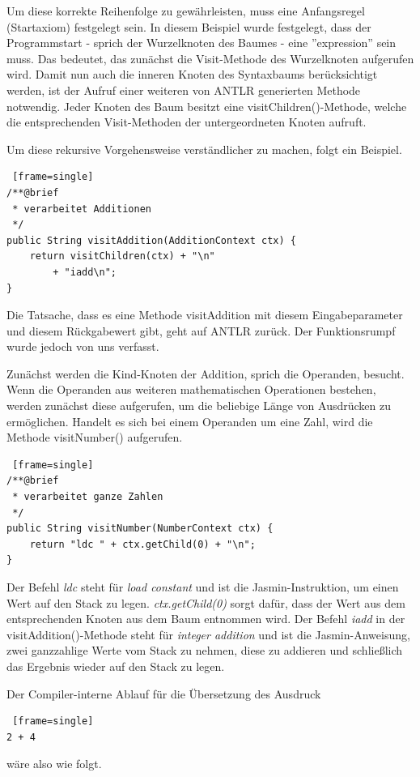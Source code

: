 \documentclass[12pt, a4paper, oneside, ngerman]{article}
\begin{document}
Um diese korrekte Reihenfolge zu gewährleisten, muss eine Anfangsregel (Startaxiom) festgelegt sein. In diesem Beispiel wurde festgelegt, dass der Programmstart - sprich der Wurzelknoten des Baumes - eine ''expression'' sein muss. Das bedeutet, das zunächst die Visit-Methode des Wurzelknoten aufgerufen wird. Damit nun auch die inneren Knoten des Syntaxbaums berücksichtigt werden, ist der Aufruf einer weiteren von ANTLR generierten Methode notwendig. Jeder Knoten des Baum besitzt eine visitChildren()-Methode, welche die entsprechenden Visit-Methoden der untergeordneten Knoten aufruft.

\pagebreak

Um diese rekursive Vorgehensweise verständlicher zu machen, folgt ein Beispiel.


\begin{lstlisting} [frame=single]
/**@brief
 * verarbeitet Additionen
 */
public String visitAddition(AdditionContext ctx) {
	return visitChildren(ctx) + "\n"
		+ "iadd\n";
}
\end{lstlisting}
Die Tatsache, dass es eine Methode visitAddition mit diesem Eingabeparameter und diesem Rückgabewert gibt, geht auf ANTLR zurück. Der Funktionsrumpf wurde jedoch von uns verfasst.

Zunächst werden die Kind-Knoten der Addition, sprich die Operanden, besucht. Wenn die Operanden aus weiteren mathematischen Operationen bestehen, werden zunächst diese aufgerufen, um die beliebige Länge von Ausdrücken zu ermöglichen. Handelt es sich bei einem Operanden um eine Zahl, wird die Methode visitNumber() aufgerufen.

\begin{lstlisting} [frame=single]
/**@brief
 * verarbeitet ganze Zahlen
 */
public String visitNumber(NumberContext ctx) {
	return "ldc " + ctx.getChild(0) + "\n";
}
\end{lstlisting}

Der Befehl \textit{ldc} steht für \textit{load constant} und ist die Jasmin-Instruktion, um einen Wert auf den Stack zu legen. \textit{ctx.getChild(0)} sorgt dafür, dass der Wert aus dem entsprechenden Knoten aus dem Baum entnommen wird.
Der Befehl \textit{iadd} in der visitAddition()-Methode steht für \textit{integer addition} und ist die Jasmin-Anweisung, zwei ganzzahlige Werte vom Stack zu nehmen, diese zu addieren und schließlich das Ergebnis wieder auf den Stack zu legen.

\pagebreak

Der Compiler-interne Ablauf für die Übersetzung des Ausdruck 
\begin{lstlisting} [frame=single]
2 + 4
\end{lstlisting}
wäre also wie folgt.
\end{document}
